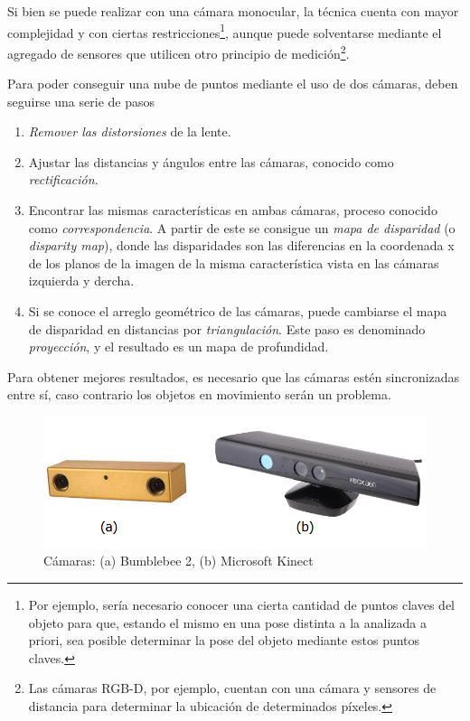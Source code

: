 Si bien se puede realizar con una cámara monocular, la técnica cuenta con mayor complejidad y con ciertas restricciones\footnote{Por ejemplo, sería necesario conocer una cierta cantidad de puntos claves del objeto para que, estando el mismo en una pose distinta a la analizada a priori, sea posible determinar la pose del objeto mediante estos puntos claves.}, aunque puede solventarse mediante el agregado de sensores que utilicen otro principio de medición\footnote{Las cámaras RGB-D, por ejemplo, cuentan con una cámara y sensores de distancia para determinar la ubicación de determinados píxeles.}.

Para poder conseguir una nube de puntos mediante el uso de dos cámaras, deben seguirse una serie de pasos \cite{kaehler2017}
\begin{enumerate}
    \item \textit{Remover las distorsiones} de la lente.
    \item Ajustar las distancias y ángulos entre las cámaras, conocido como \textit{rectificación}.
    \item Encontrar las mismas características en ambas cámaras, proceso conocido como \textit{correspondencia}. A partir de este se consigue un \textit{mapa de disparidad} (o \textit{disparity map}), donde las disparidades son las diferencias en la coordenada x de los planos de la imagen de la misma característica vista en las cámaras izquierda y dercha.
    \item Si se conoce el arreglo geométrico de las cámaras, puede cambiarse el mapa de disparidad en distancias por \textit{triangulación}. Este paso es denominado \textit{proyección}, y el resultado es un mapa de profundidad.
\end{enumerate}

Para obtener mejores resultados, es necesario que las cámaras estén sincronizadas entre sí, caso contrario los objetos en movimiento serán un problema.

\begin{figure}
    \centering
    \includegraphics[width=.9\linewidth]{Img/bumblekinect}
    \caption{Cámaras: (a) Bumblebee 2, (b) Microsoft Kinect}
    \label{fig:stereoandrgbdcameras}
\end{figure}

